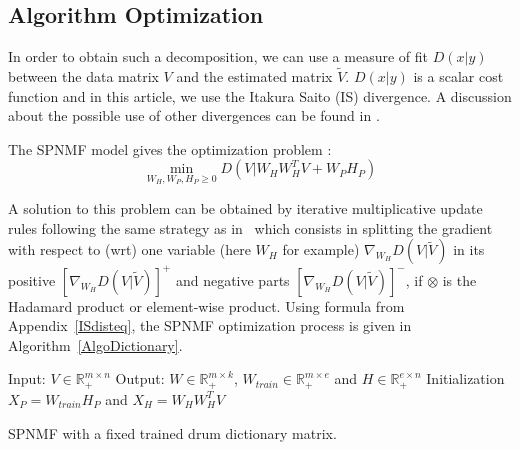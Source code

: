 \documentclass{article}
\begin{document}
\subsection{Algorithm Optimization}

In order to obtain such a decomposition, we can use a measure of fit $D(x|y)$ between the data matrix $V$ and the estimated matrix $\tilde{V}$. $D(x|y)$ is a scalar cost function and in this article, we use the Itakura Saito (IS) divergence. A discussion about the possible use of other divergences can be found in \cite{larocheJournalhidden}.

The SPNMF model gives the optimization problem : 
\begin{equation}\label{InitCost}
\min_{W_H,W_P,H_P \geq 0} D(V|W_{H}W_{H}^{T}V + W_{P} H_{P})  
\end{equation}

A solution to this problem can be obtained by iterative multiplicative update rules following the same strategy as in~\cite{yuanOja2005,Lee01algorithmsfor} which consists in splitting the gradient with respect to (wrt) one variable (here $W_H$ for example) $\nabla_{W_H} D(V|\tilde{V})$ in its positive $[\nabla_{W_H} D(V|\tilde{V})]^{+}$ and negative parts $[\nabla_{W_H} D(V|\tilde{V})]^{-}$, if $\otimes$ is the Hadamard product or element-wise product. Using formula from Appendix~\ref{ISdisteq}, the SPNMF optimization process is given in Algorithm~\ref{AlgoDictionary}.
 
\begin{algorithm}[h]
 Input: $V \in \mathbb{R}_{+}^{m \times n} $
 Output: $W \in \mathbb{R}_{+}^{m \times k}$, $W_{train} \in \mathbb{R}_+^{m \times e}$ and $H \in \mathbb{R}_{+}^{e \times n}$
 Initialization\;
 $ X_P = W_{train}H_P $ and
 $ X_H = W_HW_H^TV $ 
  
\vspace{0.2cm}
 \caption{SPNMF with a fixed trained drum dictionary matrix.}\label{AlgoDictionary}
\end{algorithm}
\end{document}

